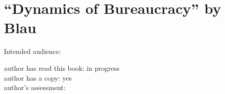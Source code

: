 \section{``Dynamics of Bureaucracy'' by Blau}

\cite{1955_Blau}

Intended audience:

author has read this book: in progress\\
author has a copy: yes\\
author's assessment:

